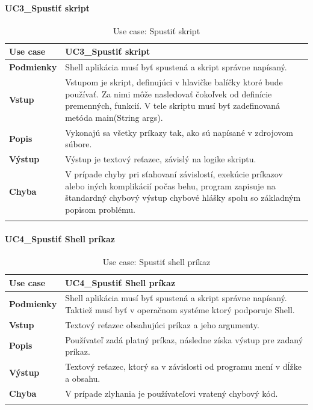 {\begin{center}
\end{center}
\paragraph{UC3\_Spustiť skript}
\begin{center}
	\begin{longtable}{|p{2.5cm}|p{12.2cm}|}
		\hline
		\textbf{Use case} & UC3\_Spustiť skript \\ 
		\hline
		\textbf{Podmienky} & Shell aplikácia musí byť spustená a skript správne napísaný.\\ 
		\hline
		\textbf{Vstup} & Vstupom je skript, definujúci v hlavičke balíčky ktoré bude používať. Za nimi môže nasledovať čokoľvek od definície premenných, funkcií. V tele skriptu musí byť zadefinovaná metóda main(String args).\\
		\hline
		\textbf{Popis} & Vykonajú sa všetky príkazy tak, ako sú napísané v zdrojovom súbore. \\ 
		\hline
		\textbf{Výstup} & Výstup je textový reťazec, závislý na logike skriptu.\\
		\hline
		\textbf{Chyba} & V prípade chyby pri sťahovaní závislostí, exekúcie príkazov alebo iných komplikácií počas behu, program zapisuje na štandardný chybový výstup chybové hlášky spolu so základným popisom problému.\\
		\hline
		\caption{Use case: Spustiť skript}
		\label{table:1}
	\end{longtable}

\end{center}

\paragraph{UC4\_Spustiť Shell príkaz}
\begin{center}
	\begin{longtable}{|p{2.5cm}|p{12.2cm}|}

			\hline
			\textbf{Use case} & UC4\_Spustiť Shell príkaz \\ 
			\hline
			\textbf{Podmienky} & Shell aplikácia musí byť spustená a skript správne napísaný. Taktiež musí byť v operačnom systéme ktorý podporuje Shell. \\ 
			\hline
			\textbf{Vstup} & Textový reťazec obsahujúci príkaz a jeho argumenty.\\
			\hline
			\textbf{Popis} & Používateľ zadá platný príkaz, následne získa výstup pre zadaný príkaz. \\ 
			\hline
			\textbf{Výstup} &Textový reťazec, ktorý sa v závislosti od programu mení v dĺžke a obsahu. \\
			\hline
			\textbf{Chyba} & V prípade zlyhania je používateľovi vratený chybový kód.\\
			\hline
		\caption{Use case: Spustiť shell príkaz}
	\label{table:1}
	

\end{longtable}
\end{center}}
